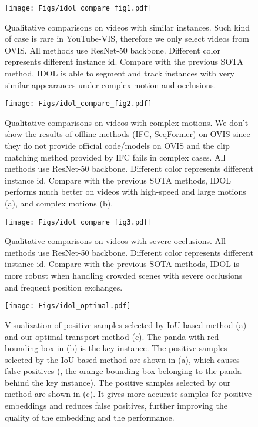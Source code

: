 \documentclass[runningheads]{llncs}
\begin{document}
\begin{figure}[h]
\centering
\texttt{[image: Figs/idol\_compare\_fig1.pdf]}
\vspace{-2em}
\caption{Qualitative comparisons on videos with similar instances. Such kind of case is rare in YouTube-VIS, therefore we only select videos from OVIS. All methods use ResNet-50 backbone. Different color represents different instance id. Compare with the previous SOTA method, IDOL is able to segment and track instances with very similar appearances under complex motion and occlusions.}
\label{fig:compare_1}
\end{figure}

\begin{figure}[h]
\centering
\texttt{[image: Figs/idol\_compare\_fig2.pdf]}
\caption{Qualitative comparisons on videos with complex motions. We don't show the results of offline methods (IFC, SeqFormer) on OVIS since they do not provide official code/models on OVIS and the clip matching method provided by IFC fails in complex cases. All methods use ResNet-50 backbone. Different color represents different instance id. Compare with the previous SOTA methods, IDOL performs much better on videos with high-speed and large motions (a), and complex motions (b).}
\label{fig:compare_2}
\end{figure}

\begin{figure}[h]
\centering
\texttt{[image: Figs/idol\_compare\_fig3.pdf]}
\vspace{-2em}
\caption{Qualitative comparisons on videos with severe occlusions. All methods use ResNet-50 backbone. Different color represents different instance id. Compare with the previous SOTA methods, IDOL is more robust when handling crowded scenes with severe occlusions and frequent position exchanges.}
\label{fig:compare_3}
\end{figure}




\begin{figure}[h]
\centering
\texttt{[image: Figs/idol\_optimal.pdf]}
\caption{Visualization of positive samples selected by IoU-based method (a) and our optimal transport method (c). The panda with red bounding box in (b) is the key instance. The positive samples selected by the IoU-based method are shown in (a), which causes false positives (\ie, the orange bounding box belonging to the panda behind the key instance). The positive samples selected by our method are shown in (c). It gives more accurate samples for positive embeddings and reduces false positives, further improving the quality of the embedding and the performance.
}
\label{fig:ot}
\vspace{-6mm}
\end{figure}
\end{document}

